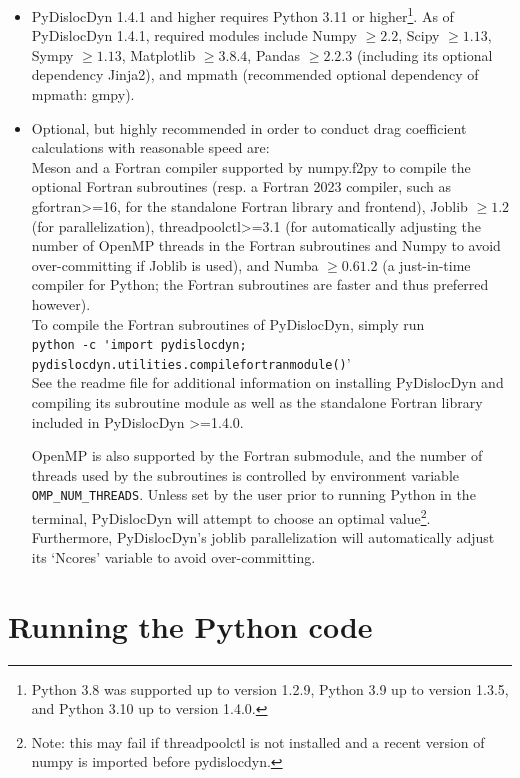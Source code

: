 \documentclass[11pt,letterpaper,oneside]{article}
\begin{document}
\begin{itemize}
\item PyDislocDyn 1.4.1 and higher requires Python 3.11 or higher\footnote{
Python 3.8 was supported up to version 1.2.9, Python 3.9 up to version 1.3.5, and Python 3.10 up to version 1.4.0.}.
As of PyDislocDyn 1.4.1, required modules include Numpy $\ge2.2$, Scipy $\ge1.13$, Sympy $\ge1.13$, Matplotlib $\ge3.8.4$, Pandas $\ge2.2.3$ (including its optional dependency Jinja2), and mpmath (recommended optional dependency of mpmath: gmpy).
\item Optional, but highly recommended in order to conduct drag coefficient calculations with reasonable speed are:\\
Meson and a Fortran compiler supported by numpy.f2py to compile the optional Fortran subroutines (resp. a Fortran 2023 compiler, such as gfortran>=16, for the standalone Fortran library and frontend), Joblib $\ge1.2$ (for parallelization),
threadpoolctl>=3.1 (for automatically adjusting the number of OpenMP threads in the Fortran subroutines and Numpy to avoid over-committing if Joblib is used), and 
Numba $\ge0.61.2$ (a just-in-time compiler for Python; the Fortran subroutines are faster and thus preferred however).
\\
To compile the Fortran subroutines of PyDislocDyn, simply run\\
 \verb|python -c 'import pydislocdyn; pydislocdyn.utilities.compilefortranmodule()|'\\
See the readme file for additional information on installing PyDislocDyn and compiling its subroutine module as well as the standalone Fortran library included in PyDislocDyn >=1.4.0.

OpenMP is also supported by the Fortran submodule, and the number of threads used by the subroutines is controlled by environment variable \verb|OMP_NUM_THREADS|.
Unless set by the user prior to running Python in the terminal, PyDislocDyn will attempt to choose an optimal value\footnote{
Note: this may fail if threadpoolctl is not installed and a recent version of numpy is imported before pydislocdyn.}.
Furthermore, PyDislocDyn's joblib parallelization will automatically adjust its `Ncores' variable to avoid over-committing.
\end{itemize}


\section{Running the Python code}
\end{document}
